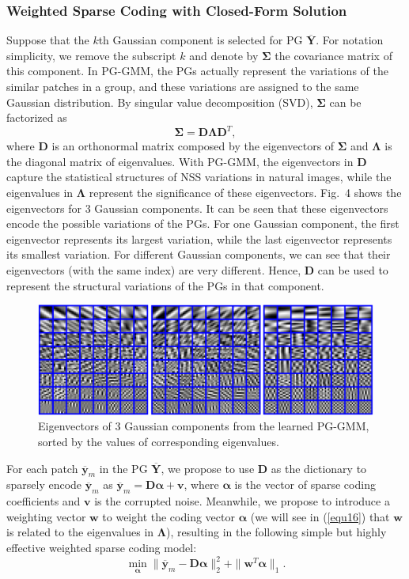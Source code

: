\subsubsection{Weighted Sparse Coding with Closed-Form Solution}
Suppose that the $k$th Gaussian component is selected for PG $\bm{\overline{Y}}$. For notation simplicity, we remove the subscript $k$ and denote by $\bm{\Sigma}$ the covariance matrix of this component. In PG-GMM, the PGs actually represent the variations of the similar patches in a group, and these variations are assigned to the same Gaussian distribution. By singular value decomposition (SVD), $\bm{\Sigma}$ can be factorized as
\begin{equation}\label{equ10}
\bm{\Sigma} = \bm{D}\bm{\Lambda}\bm{D}^{T},
\end{equation}
where $\bm{D}$ is an orthonormal matrix composed by the eigenvectors of $\bm{\Sigma}$ and $\bm{\Lambda}$ is the diagonal matrix of eigenvalues. With PG-GMM, the eigenvectors  in $\bm{D}$ capture the statistical structures of NSS variations in natural images, while the eigenvalues in $\bm{\Lambda}$ represent the significance of these eigenvectors. Fig.\ 4 shows the eigenvectors for 3 Gaussian components. It can be seen that these eigenvectors encode the possible variations of the PGs. For one Gaussian component, the first eigenvector represents its largest variation, while the last eigenvector represents its smallest variation. For different Gaussian components, we can see that their eigenvectors (with the same index) are very different. Hence, $\bm{D}$ can be used to represent the structural variations of the PGs in that component.
\begin{figure}[t]
\centering
\includegraphics[width=1\linewidth]{images/pgpd/dics.png}
\caption{Eigenvectors of 3 Gaussian components from the learned PG-GMM, sorted by the values of corresponding eigenvalues.}
\label{fig4}
\end{figure}

For each patch $\bm{\overline{y}}_{m}$ in the PG $\bm{\overline{Y}}$, we propose to use $\bm{D}$ as the dictionary to sparsely encode $\bm{\overline{y}}_{m}$ as $\bm{\overline{y}}_{m}=\bm{D}\bm{\alpha}+\bm{v}$, where $\bm{\alpha}$ is the vector of sparse coding coefficients and $\bm{v}$ is the corrupted noise. Meanwhile, we propose to introduce a weighting vector $\bm{w}$ to weight the coding vector $\bm{\alpha}$ (we will see in (\ref{equ16}) that $\bm{w}$ is related to the eigenvalues in $\bm{\Lambda}$), resulting in the following simple but highly effective weighted sparse coding model:
\begin{equation}\label{equ11}
\min_{\bm{\alpha}}{\|\bm{\overline{y}}_{m}-\bm{D}\bm{\alpha}\|_{2}^{2}+\|\bm{w}^{T}\bm{\alpha}\|_{1}}.
\end{equation}

